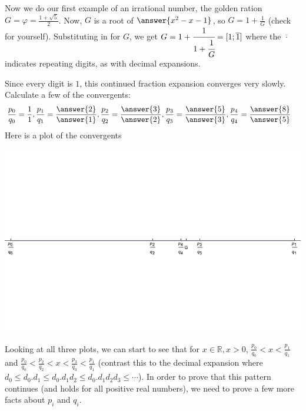 \documentclass{ximera}
\begin{document}
\begin{example}
 Now we do our first example of an irrational number, the golden ration $G=\varphi=\frac{1+\sqrt{5}}{2}$. Now, $G$ is a root of $\answer{x^2-x-1}$, so $G=1+\frac{1}{G}$ (check for yourself). Substituting in for $G$, we get $G=1+\cfrac{1}{1+\cfrac{1}{G}}=[1;\overline{1}]$ where the $\overline{\cdot}$ indicates repeating digits, as with decimal expansions.
 
 Since every digit is $1$, this continued fraction expansion converges very slowly. Calculate a few of the convergents:
 \begin{align*}
  \frac{p_0}{q_0}&=\frac{1}{1}, \frac{p_1}{q_1}=\frac{\answer{2}}{\answer{1}},\frac{p_2}{q_2}=\frac{\answer{3}}{\answer{2}}, \frac{p_3}{q_3}=\frac{\answer{5}}{\answer{3}}, \frac{p_4}{q_4}=\frac{\answer{8}}{\answer{5}}\end{align*}
Here is a plot of the convergents
\begin{image}
 \includegraphics{example2}
\end{image}
\end{example}

Looking at all three plots, we can start to see that for $x\in\mathbb{R},x>0$, $\frac{p_0}{q_0}<x<\frac{p_1}{q_1}$ and $\frac{p_0}{q_0}<\frac{p_2}{q_2}<x<\frac{p_3}{q_3}<\frac{p_1}{q_1}$ (contrast this to the decimal expansion where $d_0\leq d_0.d_1\leq d_0.d_1d_2\leq d_0.d_1 d_2 d_3\leq\cdots$). In order to prove that this pattern continues (and holds for all positive real numbers), we need to prove a few more facts about $p_i$ and $q_i$.
\end{document}
